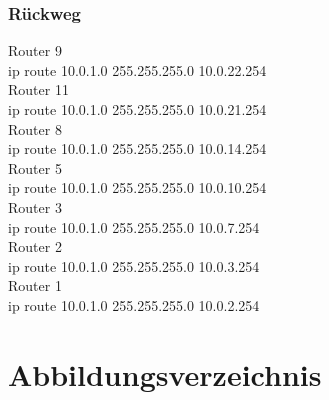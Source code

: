\documentclass[a4paper]{article}
\begin{document}
\subsubsection{Rückweg}

Router 9\\
ip route 10.0.1.0 255.255.255.0 10.0.22.254 \\
Router 11\\
ip route 10.0.1.0 255.255.255.0 10.0.21.254 \\
Router 8\\
ip route 10.0.1.0 255.255.255.0 10.0.14.254 \\
Router 5\\
ip route 10.0.1.0 255.255.255.0 10.0.10.254 \\
Router 3\\
ip route 10.0.1.0 255.255.255.0 10.0.7.254 \\
Router 2\\
ip route 10.0.1.0 255.255.255.0 10.0.3.254 \\
Router 1\\
ip route 10.0.1.0 255.255.255.0 10.0.2.254 \\



\newpage

\section{Abbildungsverzeichnis}

\listoffigures
\end{document}
